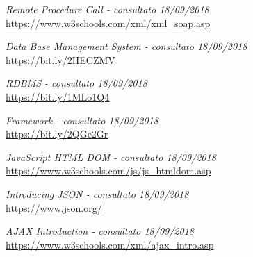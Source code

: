 \begin{thebibliography}{99}
	\textit{Remote Procedure Call - consultato 18/09/2018}\\
	\url{https://www.w3schools.com/xml/xml_soap.asp}	

	\textit{Data Base Management System - consultato 18/09/2018}\\
	\url{https://bit.ly/2HECZMV}

	\textit{RDBMS - consultato 18/09/2018}\\
	\url{https://bit.ly/1MLo1Q4}
	
	\textit{Framework - consultato 18/09/2018}\\
	\url{https://bit.ly/2QGe2Gr}
	

	\textit{JavaScript HTML DOM - consultato 18/09/2018}\\
	\url{https://www.w3schools.com/js/js_htmldom.asp}	
	

	\textit{Introducing JSON - consultato 18/09/2018}\\
	\url{https://www.json.org/}


	\textit{AJAX Introduction - consultato 18/09/2018}\\
	\url{https://www.w3schools.com/xml/ajax_intro.asp}
	
\end{thebibliography}


